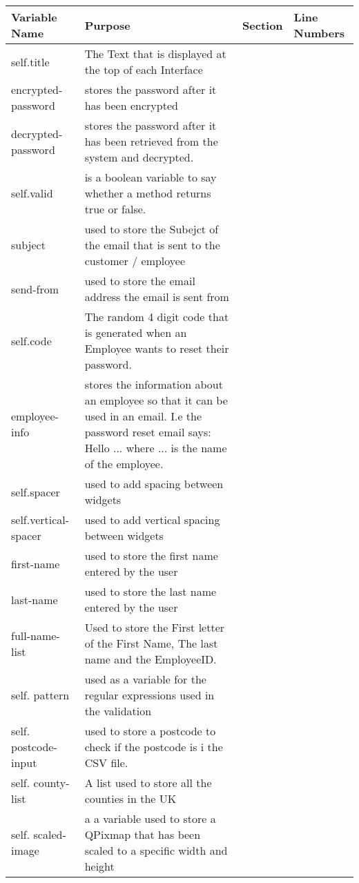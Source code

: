    \begin{longtable}{|p{1.5cm}|p{4.5cm}|p{2cm}|p{2cm}|}
        \hline
        \textbf{Variable Name} & \textbf{Purpose} & \textbf{Section} & \textbf{Line Numbers}\\ \hline
	self.title & The Text that is displayed at the top of each Interface & & \\ \hline
	encrypted-password & stores the password after it has been encrypted & & \\ \hline
	decrypted-password & stores the password after it has been retrieved from the system and decrypted. & & \\ \hline
	self.valid & is a boolean variable to say whether a method returns true or false. & & \\ \hline
	subject & used to store the Subejct of the email that is sent to the customer / employee & & \\ \hline
	send-from & used to store the email address the email is sent from & & \\ \hline
	self.code & The random 4 digit code that is generated when an Employee wants to reset their password. & & \\ \hline
	employee-info & stores the information about an employee so that it can be used in an email. I.e the password reset email says: Hello ... where ... is the name of the employee. & & \\ \hline
	self.spacer & used to add spacing between widgets & & \\ \hline
	self.vertical-spacer& used to add vertical spacing between widgets & & \\ \hline
	first-name & used to store the first name entered by the user & & \\ \hline
	last-name & used to store the last name entered by the user & & \\ \hline
	full-name-list & Used to store the First letter of the First Name, The last name and the EmployeeID. & & \\ \hline
	self. pattern & used as a variable for the regular expressions used in the validation & & \\ \hline
	self. postcode-input & used to store a postcode to check if the postcode is i the CSV file. & & \\ \hline
	self. county-list & A list used to  store all the counties in the UK & & \\ \hline
	self. scaled-image & a a variable used to store a QPixmap that has been scaled to a specific width and height & & \\ \hline

\end{longtable}
